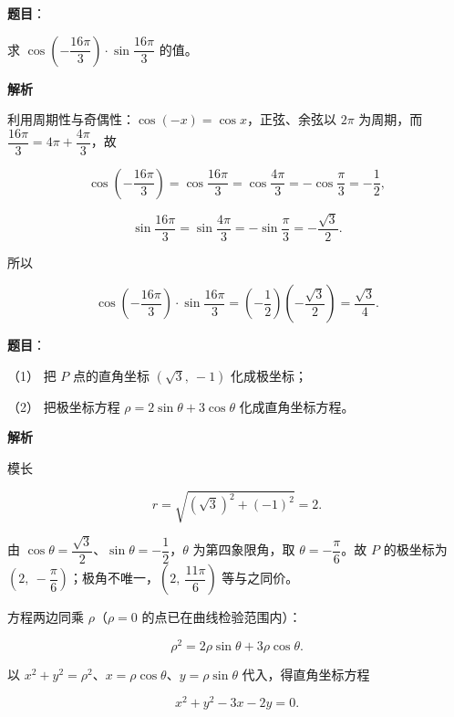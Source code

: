 \begin{answer}

\textbf{题目}：

求 $\cos\left(-\dfrac{16\pi}{3}\right)\cdot\sin\dfrac{16\pi}{3}$ 的值。

\textbf{解析}

利用周期性与奇偶性：$\cos(-x)=\cos x$，正弦、余弦以 $2\pi$ 为周期，而 $\dfrac{16\pi}{3}=4\pi+\dfrac{4\pi}{3}$，故

\nopagebreak[4]
\[
\cos\left(-\frac{16\pi}{3}\right)=\cos\frac{16\pi}{3}=\cos\frac{4\pi}{3}=-\cos\frac{\pi}{3}=-\frac{1}{2},
\]

\nopagebreak[4]
\[
\sin\frac{16\pi}{3}=\sin\frac{4\pi}{3}=-\sin\frac{\pi}{3}=-\frac{\sqrt{3}}{2}.
\]

所以

\nopagebreak[4]
\[
\cos\left(-\frac{16\pi}{3}\right)\cdot\sin\frac{16\pi}{3}
=\left(-\frac{1}{2}\right)\left(-\frac{\sqrt{3}}{2}\right)=\frac{\sqrt{3}}{4}.
\]


\end{answer}
\begin{answer}

\textbf{题目}：

（1） 把 $P$ 点的直角坐标 $\left(\sqrt{3},\ -1\right)$ 化成极坐标；

（2） 把极坐标方程 $\rho=2\sin\theta+3\cos\theta$ 化成直角坐标方程。

\textbf{解析}


模长

\nopagebreak[4]
\[
r=\sqrt{\left(\sqrt{3}\right)^{2}+(-1)^{2}}=2.
\]

由 $\cos\theta=\dfrac{\sqrt{3}}{2}$、$\sin\theta=-\dfrac{1}{2}$，$\theta$ 为第四象限角，取 $\theta=-\dfrac{\pi}{6}$。故 $P$ 的极坐标为 $\left(2,\ -\dfrac{\pi}{6}\right)$；极角不唯一，$\left(2,\ \dfrac{11\pi}{6}\right)$ 等与之同价。


方程两边同乘 $\rho$（$\rho=0$ 的点已在曲线检验范围内）：

\nopagebreak[4]
\[
\rho^{2}=2\rho\sin\theta+3\rho\cos\theta.
\]

以 $x^{2}+y^{2}=\rho^{2}$、$x=\rho\cos\theta$、$y=\rho\sin\theta$ 代入，得直角坐标方程

\nopagebreak[4]
\[
x^{2}+y^{2}-3x-2y=0.
\]



\end{answer}
